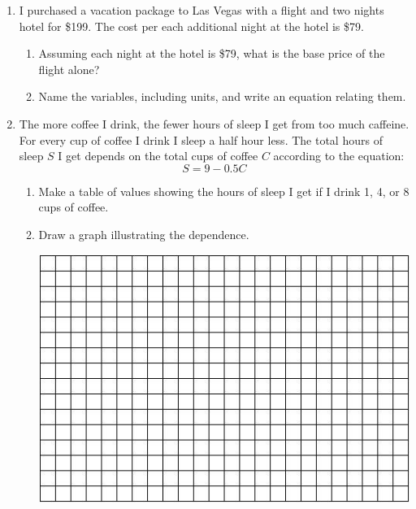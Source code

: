 \documentclass[12pt]{article}
\begin{document}
\begin{enumerate}
\item I purchased a vacation package to Las Vegas with a flight and two nights hotel for \$199.  The cost per each additional night at the hotel is \$79.  

\begin{enumerate}
\item Assuming each night at the hotel is \$79, what is the base price of the flight alone?
\vfill

\item Name the variables, including units, and write an equation relating them.
\vfill
\vfill
\end{enumerate}
\newpage %
\item The more coffee I drink, the fewer hours of sleep I get from too much caffeine.  For every cup of coffee I drink I sleep a half hour less.  The total hours of sleep $S$ I get depends on the total cups of coffee $C$ according to the equation: $$S=9-0.5C$$

\begin{enumerate}
\item Make a table of values showing the hours of sleep I get if I drink 1, 4, or 8 cups of coffee. 
\vfill
\vfill
\item Draw a graph illustrating the dependence.  

\vspace{.1in}
\begin{center}
 {\includegraphics [width = 6in] {../GraphPaper}}
\end{center}
\vspace{.1in}


\end{enumerate}
\end{enumerate}
\end{document}
